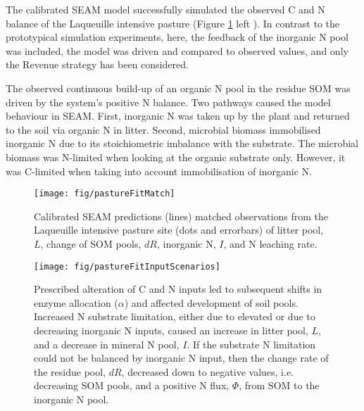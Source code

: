 The calibrated SEAM model successfully simulated the
observed C and N balance of the Laqueuille intensive pasture (Figure
\ref{fig:pastureFitMatch} left ). In contrast to the prototypical simulation
experiments, here, the feedback of the inorganic N pool was included, the model
was driven and compared to observed values, and only the Revenue strategy has
been considered.

The observed continuous build-up of an organic N pool in the residue SOM was
driven by the system's positive N balance. Two pathways caused the model
behaviour in SEAM. First, inorganic N was taken up by the plant and returned to
the soil via organic N in litter. Second, microbial biomass immobilised
inorganic N due to its stoichiometric imbalance with the substrate. The
microbial biomass was N-limited when looking at the organic substrate only.
However, it was C-limited when taking into account immobilisation of inorganic
N.

\begin{figure}[t] \vspace*{2mm}
\begin{center}
\texttt{[image: fig/pastureFitMatch]} 
\end{center}
\caption{
Calibrated SEAM predictions (lines)  matched observations from the
Laqueuille intensive pasture site (dots and errorbars) of litter pool, $L$, change of
SOM pools, $dR$, inorganic N, $I$, and N leaching rate.
\label{fig:pastureFitMatch}}
\end{figure}

\begin{figure}[t] \vspace*{2mm}
\begin{center}
\texttt{[image: fig/pastureFitInputScenarios]} 
\end{center}
\caption{
Prescribed alteration of C and N inputs led to subsequent shifts in enzyme
allocation ($\alpha$) and affected development of soil pools.
Increased N substrate limitation, either due to elevated  or due to
decreasing inorganic N inputs, caused an increase in litter pool, $L$, and a
decrease in mineral N pool, $I$. If the substrate N limitation could not be
balanced by inorganic N input, then the change rate of the residue pool, $dR$,
decreased down to negative values, i.e. decreasing SOM pools, and a
positive N flux, $\Phi$, from SOM to the inorganic N pool.
\label{fig:pastureFitScen}}
\end{figure}   
   
